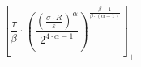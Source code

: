 \[\left\lfloor \frac{\tau}{\beta} \cdot \left(\frac{\left(\frac{\sigma \cdot R}{\varepsilon}\right)^{\alpha}}{2^{4 \cdot \alpha - 1}}\right)^{\frac{\beta + 1}{\beta \cdot \left(\alpha - 1\right)}} \right\rfloor_{+}\]
